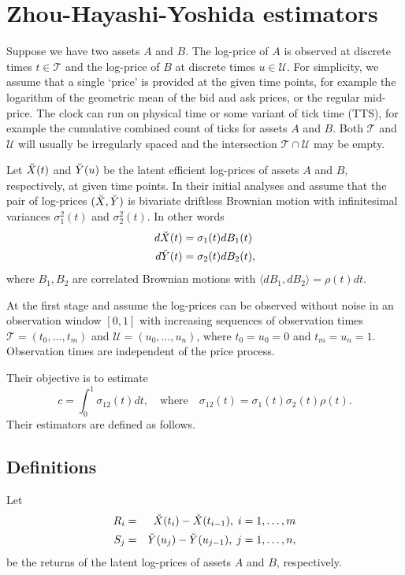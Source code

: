 \section{Zhou-Hayashi-Yoshida estimators}\label{sec:cross}
Suppose we have two assets $A$ and $B$.  The log-price of $A$ is observed at discrete times $t \in \mathcal{T}$ and the log-price of $B$ at discrete times $u \in \mathcal{U}$.  For simplicity, we assume that a single `price' is provided at the given time points, for example the logarithm of the geometric mean of the bid and ask prices, or the regular mid-price.  The clock can run on physical time or some variant of tick time (TTS), for example the cumulative combined count of ticks for assets $A$ and $B$.  Both $\mathcal{T}$ and $\mathcal{U}$ will usually be irregularly spaced and the intersection $\mathcal{T} \cap \mathcal{U}$ may be empty. 

Let $\breve{X}(t)$ and $\breve{Y}(u)$ be the latent efficient log-prices of assets $A$ and $B$, respectively, at given time points. In their initial analyses \citet{zhou1998estimating} and \citet{hayashi2005covariance} assume that the pair of log-prices $(\breve{X},\breve{Y})$ is bivariate driftless Brownian motion with infinitesimal variances $\sigma^2_1(t)$ and $\sigma_2^2(t)$. In other words 
\begin{align}\label{eq:bivariateBM}
d\breve{X}(t) &= \sigma_1(t) dB_1(t) \nonumber \\
d\breve{Y}(t) &= \sigma_2(t) dB_2(t),
\end{align}
where $B_1,B_2$ are correlated Brownian motions with $ \langle dB_1,dB_2\rangle = \rho(t)dt.$
  
At the first stage \citet{zhou1998estimating} and \citet{hayashi2005covariance} assume the log-prices can be observed without noise in an observation window $[0,1]$ with increasing sequences of observation times 
$\mathcal{T} = (t_0,\dots,t_{m})$ and
$\mathcal{U} = (u_0,\dots,u_{n})$,
where $t_0 = u_0 = 0$ and $t_{m} = u_{n} = 1$. Observation times are independent of the price process. 

Their objective is to estimate 
$$ c = \int_0^1 \sigma_{12}(t) dt,\quad \text{where} \quad  \sigma_{12}(t) = \sigma_1(t) \sigma_2(t)\rho(t).
$$
Their estimators are defined as follows.
%
\subsection{Definitions}\label{sec:ZHYdefns}
Let
\begin{eqnarray*}
R_i&=&\breve{X}(t_i) - \breve{X}(t_{i-1}),\;  i= 1,\dots,m \\
S_j&=&\breve{Y}(u_j) - \breve{Y}(u_{j-1}),\;  j= 1,\dots,n,
\end{eqnarray*}
be the returns of the latent log-prices of assets $A$ and $B$, respectively.

